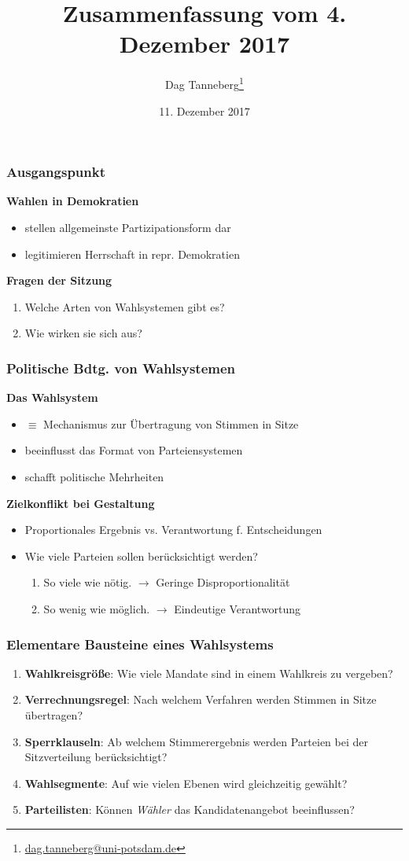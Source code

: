 \documentclass{beamer}
\title{Zusammenfassung vom 4. Dezember 2017}
\author{Dag Tanneberg\thanks{%
  \href{mailto:dag.tanneberg@uni-potsdam.de}%
    {dag.tanneberg@uni-potsdam.de}
  }
}
\institute[Universität Potsdam]{
  {\glqq}Grundlagen der Vergleichenden Politikwissenschaft{\grqq}\\
  Universität Potsdam\\
  Lehrstuhl für Vergleichende Politikwissenschaft\\
  Wintersemester 2017/2018
}
\date{11. Dezember 2017}
\begin{document}
\maketitle

\begin{frame}
\frametitle{Ausgangspunkt}

\textbf{Wahlen in Demokratien}
\begin{itemize}
  \item stellen allgemeinste Partizipationsform dar
  \item legitimieren Herrschaft in repr. Demokratien
\end{itemize}

\textbf{Fragen der Sitzung}
\begin{enumerate}
  \item Welche Arten von Wahlsystemen gibt es?
  \item Wie wirken sie sich aus?
\end{enumerate}
\end{frame}

\begin{frame}
\frametitle{Politische Bdtg. von Wahlsystemen}
\textbf{Das Wahlsystem}
\begin{itemize}
  \item $\equiv$ Mechanismus zur Übertragung von Stimmen in Sitze
  \item beeinflusst das Format von Parteiensystemen
  \item schafft politische Mehrheiten
\end{itemize}
\textbf{Zielkonflikt bei Gestaltung}
\begin{itemize}
  \item Proportionales Ergebnis vs. Verantwortung f. Entscheidungen
  \item Wie viele Parteien sollen berücksichtigt werden?
  \begin{enumerate}
    \item So viele wie nötig. $\rightarrow$ Geringe Disproportionalität
    \item So wenig wie möglich. $\rightarrow$ Eindeutige Verantwortung
  \end{enumerate}
\end{itemize}
\end{frame}

\begin{frame}
\frametitle{Elementare Bausteine eines Wahlsystems}
\begin{enumerate}
  \item \textbf{Wahlkreisgröße}: Wie viele Mandate sind in einem Wahlkreis zu vergeben?
  \item \textbf{Verrechnungsregel}: Nach welchem Verfahren werden Stimmen in Sitze übertragen?
  \item \textbf{Sperrklauseln}: Ab welchem Stimmerergebnis werden Parteien bei der Sitzverteilung berücksichtigt?
  \item \textbf{Wahlsegmente}: Auf wie vielen Ebenen wird gleichzeitig gewählt?
  \item \textbf{Parteilisten}: Können \textit{Wähler} das Kandidatenangebot beeinflussen?
\end{enumerate}
\end{frame}
\end{document}
